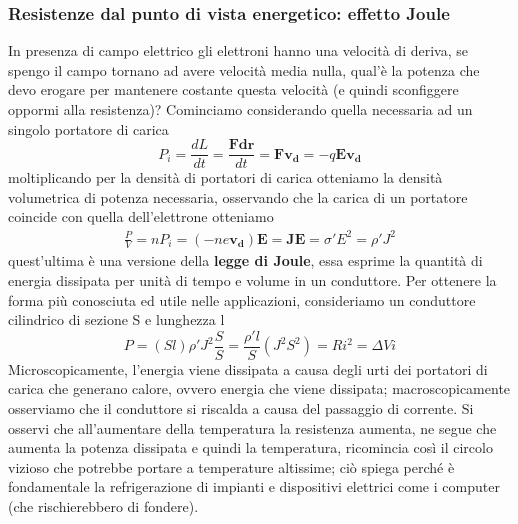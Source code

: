 \documentclass[
10pt, %
a4paper, %
oneside, %
headinclude,footinclude, %
BCOR5mm, %
]{scrartcl}
\begin{document}
\subsubsection*{Resistenze dal punto di vista energetico: effetto Joule}
In presenza di campo elettrico gli elettroni hanno una velocità di deriva, se spengo il campo tornano ad avere velocità media nulla, qual'è la potenza che devo erogare per mantenere costante questa velocità (e quindi sconfiggere oppormi alla resistenza)? Cominciamo considerando quella necessaria ad un singolo portatore di carica
\[P_i = \frac{dL}{dt}= \frac{\mathbf{F}\mathbf{dr}}{dt}= \mathbf{F}\mathbf{v_d}= -q\mathbf{E}\mathbf{v_d}\] 
moltiplicando per la densità di portatori di carica otteniamo la densità volumetrica di potenza necessaria, osservando che la carica di un portatore coincide con quella dell'elettrone otteniamo
\begin{align}\label{eq:effetto_Joule}
	\frac{P}{V}= nP_i=  (-ne\mathbf{v_d})\mathbf{E}= \mathbf{J}\mathbf{E}= \sigma' E^2= \rho' J^2
\end{align}
quest'ultima è una versione della \textbf{legge di Joule}, essa esprime la quantità di energia dissipata per unità di tempo e volume in un conduttore. Per ottenere la forma più conosciuta ed utile nelle applicazioni, consideriamo un conduttore cilindrico di sezione S e lunghezza l
\[P = (Sl) \rho' J^2 \frac{S}{S} = \frac{\rho' l}{S}(J^2 S^2)= Ri^2= \Delta V i \]
Microscopicamente, l'energia viene dissipata a causa degli urti dei portatori di carica che generano calore, ovvero energia che viene dissipata; macroscopicamente osserviamo che il conduttore si riscalda a causa del passaggio di corrente. Si osservi che all'aumentare della temperatura la resistenza aumenta, ne segue che aumenta la potenza dissipata e quindi la temperatura, ricomincia così il circolo vizioso che potrebbe portare a temperature altissime; ciò spiega perché è fondamentale la refrigerazione di impianti e dispositivi elettrici come i computer (che rischierebbero di fondere).    
\end{document}
